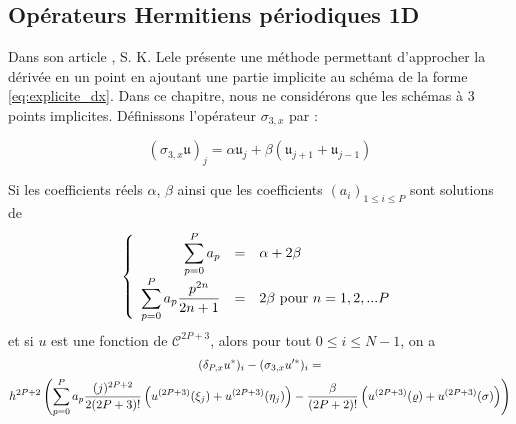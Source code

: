 \subsection{Opérateurs Hermitiens périodiques 1D}

Dans son article \cite{Lele1991}, S. K. Lele présente une méthode permettant d'approcher la dérivée en un point en ajoutant une partie implicite au schéma de la forme \eqref{eq:explicite_dx}. Dans ce chapitre, nous ne considérons que les schémas à 3 points implicites. Définissons l'opérateur $\sigma_{3,x}$ par :

\begin{equation}
(\sigma_{3,x} \mathfrak{u})_j = \alpha \mathfrak{u}_j + \beta \left( \mathfrak{u}_{j+1} + \mathfrak{u}_{j-1} \right)
\end{equation}

\begin{theoreme}
Si les coefficients réels $\alpha$, $\beta$ ainsi que les coefficients $(a_i)_{1 \leq i \leq P}$ sont solutions de 
\begin{equation}
\left\lbrace
\begin{array}{rcl}
\displaystyle\sum\limits_{p=0}^P a_p & = & \alpha + 2 \beta \\
\displaystyle\sum\limits_{p=0}^P a_p \dfrac{p^{2n}}{2n+1} & = & 2 \beta  \text{ pour } n=1,2,...P
\end{array}
\right.
\label{eq:hermitian_system}
\end{equation}
et si $u$ est une fonction de $\mathcal{C}^{2P+3}$, alors pour tout $0 \leq i \leq N-1$, on a 
\begin{multline}
(\delta_{P,x} u^*)_i - (\sigma_{3,x} u'^*)_i = \\
h^{2P+2} \left( \displaystyle\sum\limits_{p=0}^P a_p  \dfrac{(j)^{2P+2}}{2(2P+3)!} \left( u^{(2P+3)}(\xi_j) + u^{(2P+3)}(\eta_j) \right) - \dfrac{\beta}{(2P+2)!} \left(u^{(2P+3)}(\varrho) + u^{(2P+3)}(\sigma) \right) \right)
\end{multline}
\end{theoreme}

